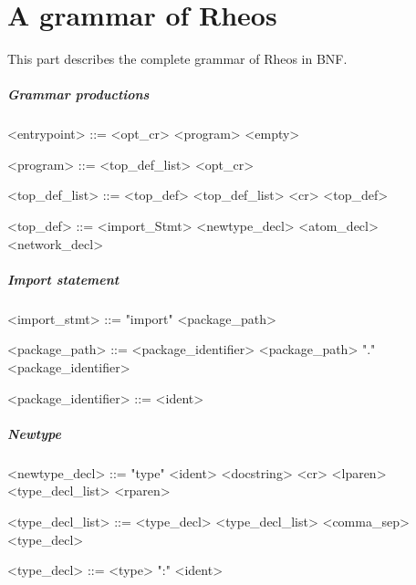 \chapter{A grammar of Rheos}\label{ch:bnf}
This part describes the complete grammar of Rheos in BNF.



\paragraph{Grammar productions}

\begin{grammar}
  <entrypoint> ::= <opt_cr> <program>
  \alt <empty>

  <program> ::= <top_def_list> <opt_cr>

  <top_def_list> ::= <top_def>
  \alt <top_def_list> <cr> <top_def>

  <top_def> ::= <import_Stmt>
  \alt <newtype_decl>
  \alt <atom_decl>
  \alt <network_decl>
\end{grammar}


\paragraph{Import statement}

\begin{grammar}
  <import_stmt> ::= "import" <package_path>

  <package_path> ::= <package_identifier>
  \alt <package_path> "." <package_identifier>

  <package_identifier> ::= <ident>
\end{grammar}


\paragraph{Newtype}

\begin{grammar}
  <newtype_decl> ::= "type" <ident> <docstring> <cr> <lparen>
  <type_decl_list> <rparen>

  <type_decl_list> ::= <type_decl>
  \alt <type_decl_list> <comma_sep> <type_decl>

  <type_decl> ::= <type> ":" <ident>
\end{grammar}


